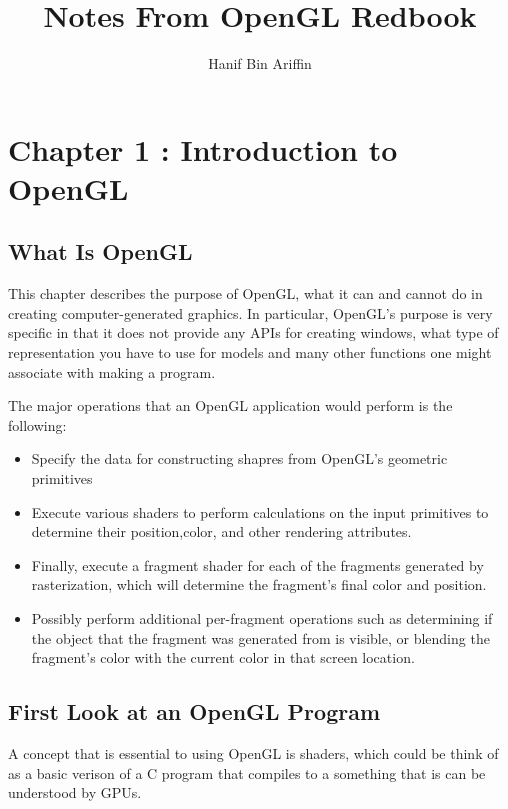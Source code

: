 \documentclass[a4paper, 14pt]{extarticle}
\title{Notes From OpenGL Redbook}
\author{Hanif Bin Ariffin}
\begin{document}
\maketitle
\tableofcontents

\newpage
\section{Chapter 1 : Introduction to OpenGL}

\subsection{What Is OpenGL}

This chapter describes the purpose of OpenGL, what it can and cannot do in creating computer-generated graphics.
In particular, OpenGL's purpose is very specific in that it does not provide any APIs for creating windows, what type of representation you have to use for models and many other functions one might associate with making a program.

The major operations that an OpenGL application would perform is the following:

\begin{itemize}
    \item Specify the data for constructing shapres from OpenGL's geometric primitives
    \item Execute various shaders to perform calculations on the input primitives to determine their position,color, and other rendering attributes.
    \item Finally, execute a fragment shader for each of the fragments generated by rasterization, which will determine the fragment's final color and position.
    \item Possibly perform additional per-fragment operations such as determining if the object that the fragment was generated from is visible, or blending the fragment's color with the current color in that screen location.
\end{itemize}

\subsection{First Look at an OpenGL Program}

A concept that is essential to using OpenGL is shaders, which could be think of as a basic verison of a C program that compiles to a something that is can be understood by GPUs.
\end{document}
